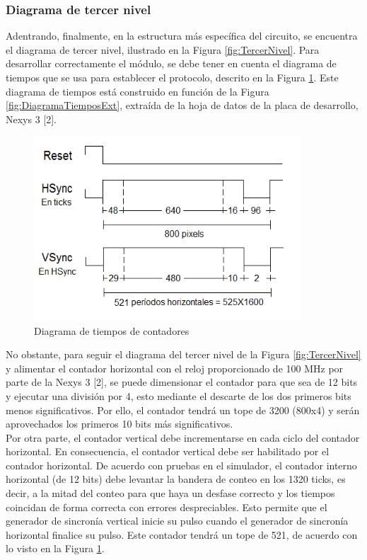 \documentclass[12pt,a4paper]{article}
\begin{document}
\subsubsection{Diagrama de tercer nivel}
Adentrando, finalmente, en la estructura más específica del circuito, se encuentra el diagrama de tercer nivel, ilustrado en la Figura \ref{fig:TercerNivel}. Para desarrollar correctamente el módulo, se debe tener en cuenta el diagrama de tiempos que se usa para establecer el protocolo, descrito en la Figura \ref{fig:DiagramaTiempos}. Este diagrama de tiempos está construido en función de la Figura \ref{fig:DiagramaTiemposExt}, extraída de la hoja de datos de la placa de desarrollo, Nexys 3 [2].

\begin{figure}[htbp]
  \centering
    \includegraphics[width=10cm]{Img/DiagramaTiempos.png}
  \caption[3erNivel]{Diagrama de tiempos de contadores}
  \label{fig:DiagramaTiempos}
\end{figure}

No obstante, para seguir el diagrama del tercer nivel de la Figura \ref{fig:TercerNivel} y alimentar el contador horizontal con el reloj proporcionado de 100 MHz por parte de la Nexys 3 [2], se puede dimensionar el contador para que sea de 12 bits y ejecutar una división por 4, esto mediante el descarte de los dos primeros bits menos significativos. Por ello, el contador tendrá un tope de 3200 (800x4) y  serán aprovechados los primeros 10 bits más significativos. \\[2ex]
Por otra parte, el contador vertical debe incrementarse en cada ciclo del contador horizontal. En consecuencia, el contador vertical debe ser habilitado por el contador horizontal. De acuerdo con pruebas en el simulador, el contador interno horizontal (de 12 bits) debe levantar la bandera de conteo en los 1320 ticks, es decir, a la mitad del conteo para que haya un desfase correcto y los tiempos coincidan de forma correcta con errores despreciables. Esto permite que el generador de sincronía vertical inicie su pulso cuando el generador de sincronía horizontal finalice su pulso. Este contador tendrá un tope de 521, de acuerdo con lo visto en la Figura \ref{fig:DiagramaTiempos}.
\end{document}
